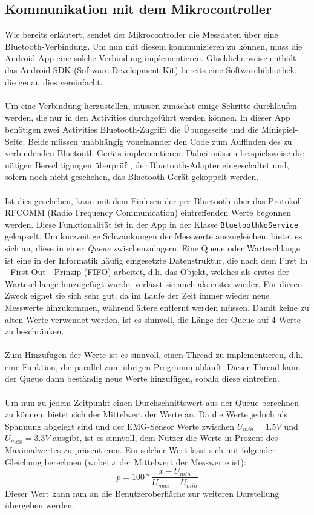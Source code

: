 \subsection{Kommunikation mit dem Mikrocontroller}
Wie bereits erläutert, sendet der Mikrocontroller die Messdaten über eine Bluetooth-Verbindung. Um nun mit  diesem kommunizieren zu können, muss die Android-App eine solche Verbindung implementieren. Glücklicherweise enthält das Android-SDK (Software Development Kit) bereits eine Softwarebibliothek, die genau dies vereinfacht.\cite{Src:AndroidBT} \cite{Src:AndroidKuenneth} \\ \\
Um eine Verbindung herzustellen, müssen zunächst einige Schritte durchlaufen werden, die nur in den Activities durchgeführt werden können. In dieser App benötigen zwei Activities Bluetooth-Zugriff: die Übungsseite und die Minispiel-Seite. Beide müssen unabhängig voneinander den Code zum Auffinden des zu verbindenden Bluetooth-Geräts implementieren. Dabei müssen beispielsweise die nötigen Berechtigungen überprüft, der Bluetooth-Adapter eingeschaltet und, sofern noch nicht geschehen, das Bluetooth-Gerät gekoppelt werden.\cite{Src:AndroidBT} \cite{Src:AndroidKuenneth} \\ \\
Ist dies geschehen, kann mit dem Einlesen der per Bluetooth über das Protokoll RFCOMM (Radio Frequency Communication)\cite{Src:AndroidKuenneth} eintreffenden Werte begonnen werden. Diese Funktionalität ist in der App in der Klasse \texttt{BluetoothNoService} gekapselt. Um kurzzeitige Schwankungen der Messwerte auszugleichen, bietet es sich an, diese in einer \textit{Queue} zwischenzulagern. Eine Queue oder Warteschlange ist eine in der Informatik häufig eingesetzte Datenstruktur, die nach dem First In - First Out - Prinzip (FIFO) arbeitet, d.h. das Objekt, welches als erstes der Warteschlange hinzugefügt wurde, verlässt sie auch als erstes wieder. Für diesen Zweck eignet sie sich sehr gut, da im Laufe der Zeit immer wieder neue Messwerte hinzukommen, während ältere entfernt werden müssen. Damit keine zu alten Werte verwendet werden, ist es sinnvoll, die Länge der Queue auf 4 Werte zu beschränken. \\ \\
Zum Hinzufügen der Werte ist es sinnvoll, einen Thread zu implementieren, d.h. eine Funktion, die parallel zum übrigen Programm abläuft. Dieser Thread kann der Queue dann beständig neue Werte hinzufügen, sobald diese eintreffen. \\ \\
Um nun zu jedem Zeitpunkt einen Durchschnittswert aus der Queue berechnen zu können, bietet sich der Mittelwert der Werte an. Da die Werte jedoch als Spannung abgelegt sind und der EMG-Sensor Werte zwischen $U_{min} = 1.5 V$ und $U_{max} = 3.3 V$ ausgibt, ist es sinnvoll, dem Nutzer die Werte in Prozent des Maximalwertes zu präsentieren. Ein solcher Wert lässt sich mit folgender Gleichung berechnen (wobei $x$ der Mittelwert der Messwerte ist):
\begin{equation*}
p = 100 * \frac{x - U_{min}}{U_{max} - U_{min}}
\end{equation*}
Dieser Wert kann nun an die Benutzeroberfläche zur weiteren Darstellung übergeben werden.
